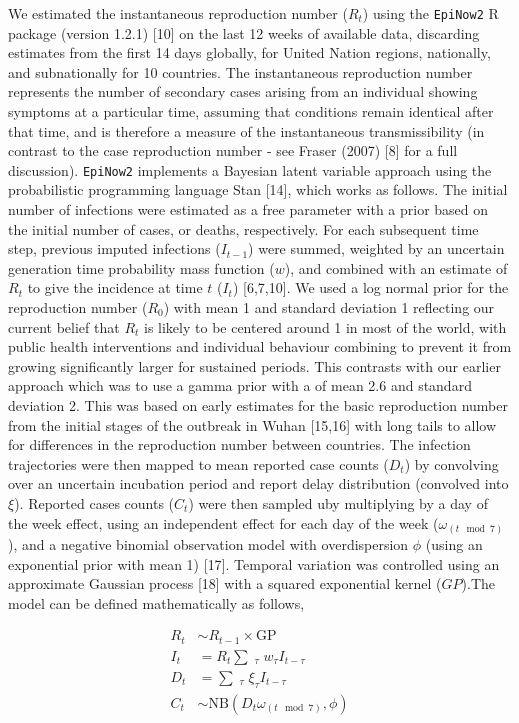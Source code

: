 \documentclass[
]{article}
\begin{document}
We estimated the instantaneous reproduction number (\(R_t\)) using the
\texttt{EpiNow2} R package (version 1.2.1) {[}10{]} on the last 12 weeks
of available data, discarding estimates from the first 14 days globally,
for United Nation regions, nationally, and subnationally for 10
countries. The instantaneous reproduction number represents the number
of secondary cases arising from an individual showing symptoms at a
particular time, assuming that conditions remain identical after that
time, and is therefore a measure of the instantaneous transmissibility
(in contrast to the case reproduction number - see Fraser (2007) {[}8{]}
for a full discussion). \texttt{EpiNow2} implements a Bayesian latent
variable approach using the probabilistic programming language Stan
{[}14{]}, which works as follows. The initial number of infections were
estimated as a free parameter with a prior based on the initial number
of cases, or deaths, respectively. For each subsequent time step,
previous imputed infections (\(I_{t-1}\)) were summed, weighted by an
uncertain generation time probability mass function (\(w\)), and
combined with an estimate of \(R_t\) to give the incidence at time \(t\)
(\(I_t\)) {[}6,7,10{]}. We used a log normal prior for the reproduction
number (\(R_0\)) with mean 1 and standard deviation 1 reflecting our
current belief that \(R_t\) is likely to be centered around 1 in most of
the world, with public health interventions and individual behaviour
combining to prevent it from growing significantly larger for sustained
periods. This contrasts with our earlier approach which was to use a
gamma prior with a of mean 2.6 and standard deviation 2. This was based
on early estimates for the basic reproduction number from the initial
stages of the outbreak in Wuhan {[}15,16{]} with long tails to allow for
differences in the reproduction number between countries. The infection
trajectories were then mapped to mean reported case counts (\(D_t\)) by
convolving over an uncertain incubation period and report delay
distribution (convolved into \(\xi\)). Reported cases counts (\(C_t\))
were then sampled uby multiplying by a day of the week effect, using an
independent effect for each day of the week (\(\omega_{(t \mod 7)}\)),
and a negative binomial observation model with overdispersion \(\phi\)
(using an exponential prior with mean 1) {[}17{]}. Temporal variation
was controlled using an approximate Gaussian process {[}18{]} with a
squared exponential kernel (\(GP\)).The model can be defined
mathematically as follows,

\begin{align}
R_{t} &\sim R_{t-1} \times \mathrm{GP} \\
I_t &= R_t \sum\mathop{}_\tau w_\tau I_{t - \tau} \\
D_t &= \sum\mathop{}_\tau \xi_\tau I_{t-\tau} \\ 
C_t &\sim \mathrm{NB}(D_t \omega_{(t \mod 7)} , \phi)
\end{align}
\end{document}
